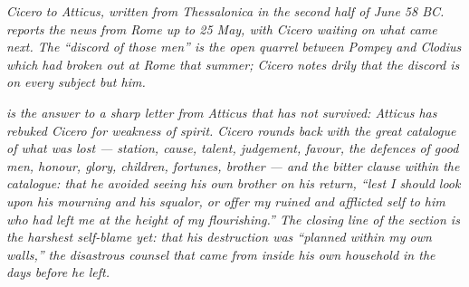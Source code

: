 
\textit{Cicero to Atticus, written from Thessalonica in the
second half of June 58 BC.  reports the news
from Rome up to 25 May, with Cicero waiting on what came next.
The ``discord of those men'' is the open quarrel between
Pompey and Clodius which had broken out at Rome that summer;
Cicero notes drily that the discord is on every subject
\textit{but} him.}

\textit{ is the answer to a sharp letter from
Atticus that has not survived: Atticus has rebuked Cicero for
weakness of spirit. Cicero rounds back with the great
catalogue of what was lost --- station, cause, talent,
judgement, favour, the defences of good men, honour, glory,
children, fortunes, brother --- and the bitter clause within
the catalogue: that he avoided seeing his own brother on his
return, ``lest I should look upon his mourning and his
squalor, or offer my ruined and afflicted self to him who had
left me at the height of my flourishing.'' The closing line of
the section is the harshest self-blame yet: that his
destruction was ``planned within my own walls,'' the
disastrous counsel that came from inside his own household
in the days before he left.}
